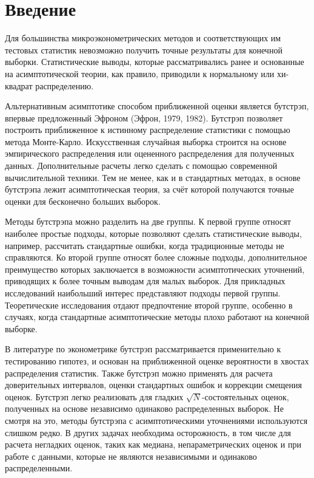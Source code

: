 \section{Введение}

Для большинства микроэконометрических методов и соответствующих им тестовых статистик невозможно получить точные результаты для конечной выборки. Статистические выводы, которые рассматривались ранее и основанные на асимптотической теории, как правило, приводили к нормальному или хи-квадрат распределению.

Альтернативным асимптотике способом приближенной оценки является бутстрэп, впервые предложенный Эфроном (Эфрон, 1979, 1982). Бутстрэп позволяет построить приближенное к истинному распределение статистики с помощью метода Монте-Карло. Искусственная случайная выборка строится на основе эмпирического распределения или оцененного распределения для полученных данных. Дополнительные расчеты легко сделать с помощью современной вычислительной техники. Тем не менее, как и в стандартных методах, в основе бутстрэпа лежит асимптотическая теория, за счёт которой получаются точные оценки для бесконечно больших выборок.

Методы бутстрэпа можно разделить на две группы. К первой группе относят наиболее простые подходы, которые позволяют сделать статистические выводы, например, рассчитать стандартные ошибки, когда традиционные методы не справляются. Ко второй группе относят более сложные подходы, дополнительное преимущество которых заключается в возможности асимптотических уточнений, приводящих к более точным выводам для малых выборок. Для прикладных исследований наибольший интерес представляют подходы первой группы. Теоретические исследования отдают предпочтение второй группе, особенно в случаях, когда стандартные асимптотические методы плохо работают на конечной выборке.

В литературе по эконометрике бутстрэп рассматривается применительно к тестированию гипотез, и основан на приближенной оценке вероятности в хвостах распределения статистик. Также бутстрэп можно применять для расчета доверительных интервалов, оценки стандартных ошибок и коррекции смещения оценок. Бутстрэп легко реализовать для гладких  $\sqrt{N}$-состоятельных оценок, полученных на основе независимо одинаково распределенных выборок. Не смотря на это,  методы бутстрэпа с асимптотическими уточнениями используются слишком редко. В других задачах необходима осторожность, в том числе для расчета негладких оценок, таких как медиана, непараметрических оценок и при работе с  данными, которые не являются независимыми и одинаково распределенными.

